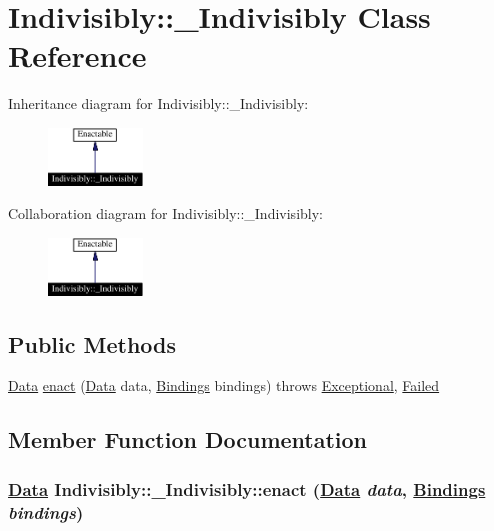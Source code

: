 \hypertarget{classIndivisibly_1_1__Indivisibly}{
\section{Indivisibly::\_\-Indivisibly  Class Reference}
\label{classIndivisibly_1_1__Indivisibly}
}
Inheritance diagram for Indivisibly::\_\-Indivisibly:\begin{figure}[H]
\begin{center}
\leavevmode
\includegraphics[width=71pt]{classIndivisibly_1_1__Indivisibly__inherit__graph}
\end{center}
\end{figure}
Collaboration diagram for Indivisibly::\_\-Indivisibly:\begin{figure}[H]
\begin{center}
\leavevmode
\includegraphics[width=71pt]{classIndivisibly_1_1__Indivisibly__coll__graph}
\end{center}
\end{figure}
\subsection*{Public Methods}
\begin{CompactItemize}
\item 
\hyperlink{interfaceData}{Data} \hyperlink{classIndivisibly_1_1__Indivisibly_a0}{enact} (\hyperlink{interfaceData}{Data} data, \hyperlink{interfaceBindings}{Bindings} bindings) throws \hyperlink{classExceptional}{Exceptional}, \hyperlink{classFailed}{Failed}
\end{CompactItemize}


\subsection{Member Function Documentation}
\hypertarget{classIndivisibly_1_1__Indivisibly_a0}{
\subsubsection[enact]{\setlength{\rightskip}{0pt plus 5cm}\hyperlink{interfaceData}{Data} Indivisibly::\_\-Indivisibly::enact (\hyperlink{interfaceData}{Data} {\em data}, \hyperlink{interfaceBindings}{Bindings} {\em bindings})}}
\label{classIndivisibly_1_1__Indivisibly_a0}




